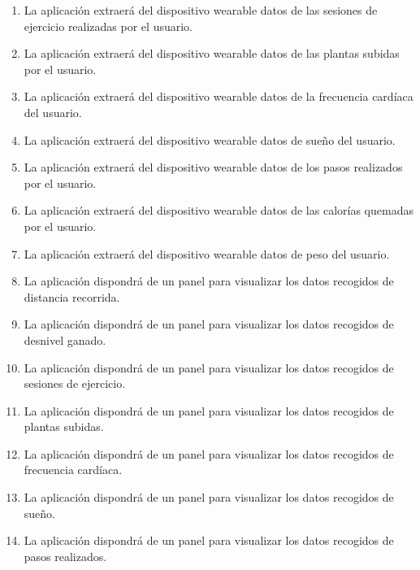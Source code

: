 \begin{enumerate}[resume=req-usuario,label=\textbf{\texttt{RU-\arabic*}}]
\begin{enumerate}[resume=req-funcionales,label=\textbf{\texttt{RF-\arabic*}}]
                \item \label{req:funcionales:extraer_ejercicio} La aplicación extraerá del dispositivo \gls{wearable} datos de las sesiones de ejercicio realizadas por el usuario.
                \item \label{req:funcionales:extraer_plantas} La aplicación extraerá del dispositivo \gls{wearable} datos de las plantas subidas por el usuario.
                \item \label{req:funcionales:extraer_pulsaciones} La aplicación extraerá del dispositivo \gls{wearable} datos de la frecuencia cardíaca del usuario.
                \item \label{req:funcionales:extraer_sueno} La aplicación extraerá del dispositivo \gls{wearable} datos de sueño del usuario.
                \item \label{req:funcionales:extraer_pasos} La aplicación extraerá del dispositivo \gls{wearable} datos de los pasos realizados por el usuario.
                \item \label{req:funcionales:extraer_calorias} La aplicación extraerá del dispositivo \gls{wearable} datos de las calorías quemadas por el usuario.
                \item \label{req:funcionales:extraer_peso} La aplicación extraerá del dispositivo \gls{wearable} datos de peso del usuario.
                \item \label{req:funcionales:visualizar_distancia} La aplicación dispondrá de un panel para visualizar los datos recogidos de distancia recorrida.
                \item \label{req:funcionales:visualizar_desnivel} La aplicación dispondrá de un panel para visualizar los datos recogidos de desnivel ganado.
                \item \label{req:funcionales:visualizar_ejercicio} La aplicación dispondrá de un panel para visualizar los datos recogidos de sesiones de ejercicio.
                \item \label{req:funcionales:visualizar_plantas} La aplicación dispondrá de un panel para visualizar los datos recogidos de plantas subidas.
                \item \label{req:funcionales:visualizar_frecuencia} La aplicación dispondrá de un panel para visualizar los datos recogidos de frecuencia cardíaca.
                \item \label{req:funcionales:visualizar_sueno} La aplicación dispondrá de un panel para visualizar los datos recogidos de sueño.
                \item \label{req:funcionales:visualizar_pasos} La aplicación dispondrá de un panel para visualizar los datos recogidos de pasos realizados.

\end{enumerate}
\end{enumerate}

